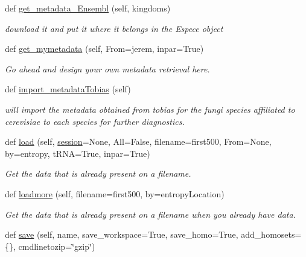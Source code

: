 \begin{DoxyCompactItemize}
def \mbox{\hyperlink{class_py_c_u_b_1_1py_c_u_b_1_1_py_c_u_b_ae561ba39b9c3919a83b51944f155e4a4}{get\+\_\+metadata\+\_\+\+Ensembl}} (self, kingdoms)
\begin{DoxyCompactList}\small\item\em download it and put it where it belongs in the Espece object \end{DoxyCompactList}\item 
def \mbox{\hyperlink{class_py_c_u_b_1_1py_c_u_b_1_1_py_c_u_b_a1ff011ae5b64518d60bedcf1b98314ef}{get\+\_\+mymetadata}} (self, From=\textquotesingle{}jerem\textquotesingle{}, inpar=True)
\begin{DoxyCompactList}\small\item\em Go ahead and design your own metadata retrieval here. \end{DoxyCompactList}\item 
def \mbox{\hyperlink{class_py_c_u_b_1_1py_c_u_b_1_1_py_c_u_b_acd80f084f6671584c42542813874cd02}{import\+\_\+metadata\+Tobias}} (self)
\begin{DoxyCompactList}\small\item\em will import the metadata obtained from tobias for the fungi species affiliated to cerevisiae to each species for further diagnostics. \end{DoxyCompactList}\item 
def \mbox{\hyperlink{class_py_c_u_b_1_1py_c_u_b_1_1_py_c_u_b_ab471e823b0eba23af5a5322008ec09da}{load}} (self, \mbox{\hyperlink{class_py_c_u_b_1_1py_c_u_b_1_1_py_c_u_b_a24fdc39b781fc1974625810704bd8140}{session}}=None, All=False, filename=\textquotesingle{}first500\textquotesingle{}, From=None, by=\textquotesingle{}entropy\textquotesingle{}, t\+R\+NA=True, inpar=True)
\begin{DoxyCompactList}\small\item\em Get the data that is already present on a filename. \end{DoxyCompactList}\item 
def \mbox{\hyperlink{class_py_c_u_b_1_1py_c_u_b_1_1_py_c_u_b_a16a1ab6be5dddcedf94852088936c1f2}{loadmore}} (self, filename=\textquotesingle{}first500\textquotesingle{}, by=\textquotesingle{}entropy\+Location\textquotesingle{})
\begin{DoxyCompactList}\small\item\em Get the data that is already present on a filename when you already have data. \end{DoxyCompactList}\item 
def \mbox{\hyperlink{class_py_c_u_b_1_1py_c_u_b_1_1_py_c_u_b_a477c55065989b10bce8389c5edaf3322}{save}} (self, name, save\+\_\+workspace=True, save\+\_\+homo=True, add\+\_\+homosets=\{\}, cmdlinetozip=\char`\"{}gzip\char`\"{})

\end{DoxyCompactItemize}

